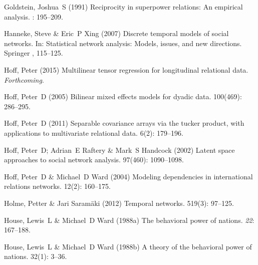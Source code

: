 \documentclass[3p,times,twocolumn,authoryear,12pt]{elsarticle}
\begin{document}
\begin{thebibliography}{}
Goldstein, Joshua~S (1991) Reciprocity in superpower relations: An empirical
  analysis.
: 195--209.

Hanneke, Steve  \& Eric~P Xing (2007) Discrete temporal models of social
  networks.
\newblock In: Statistical network analysis: Models, issues, and new directions.
  Springer  ,  115--125.

Hoff, Peter (2015) Multilinear tensor regression for longitudinal relational
  data.
 {\em Forthcoming}.

Hoff, Peter~D (2005) Bilinear mixed effects models for dyadic data.
 { 100\/}(469):
  286--295.

Hoff, Peter~D (2011) Separable covariance arrays via the tucker product, with
  applications to multivariate relational data.
 { 6\/}(2): 179--196.

Hoff, Peter~D; Adrian~E Raftery  \& Mark~S Handcock (2002) Latent space
  approaches to social network analysis.
 { 97\/}(460):
  1090--1098.

Hoff, Peter~D  \& Michael~D Ward (2004) Modeling dependencies in international
  relations networks.
 { 12\/}(2): 160--175.

Holme, Petter  \& Jari Saram{\"a}ki (2012) Temporal networks.
 { 519\/}(3): 97--125.

House, Lewis~L  \& Michael~D Ward (1988a) The behavioral power of nations.
 {\em 22}: 167--188.

House, Lewis~L  \& Michael~D Ward (1988b) A theory of the behavioral power of
  nations.
 { 32\/}(1): 3--36.


\end{thebibliography}
\end{document}
